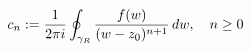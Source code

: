\documentclass[preview]{standalone}
\begin{document}
\begin{align*}
\special{dvisvgm:raw <g id='unique000'>}c_n := \frac{1}{2\pi i}\oint_{\gamma_R} \frac{f(w)}{(w-z_0)^{n+1}}\,dw,\quad n \ge 0\special{dvisvgm:raw </g>}
\end{align*}
\end{document}

